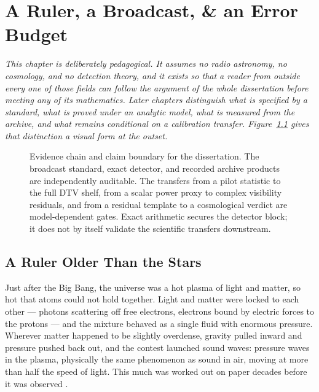 
\chapter{A Ruler, a Broadcast, \& an Error Budget}
\label{sec:intro}

\noindent\emph{This chapter is deliberately pedagogical. It assumes no radio astronomy, no cosmology, and no detection theory, and it exists so that a reader from outside every one of those fields can follow the argument of the whole dissertation before meeting any of its mathematics. Later chapters distinguish what is specified by a standard, what is proved under an analytic model, what is measured from the archive, and what remains conditional on a calibration transfer. Figure~\ref{fig:intro:claimchain} gives that distinction a visual form at the outset.}

\begin{figure}[t]
\centering
\resizebox{\linewidth}{!}{}
\caption[Evidence chain and claim boundary]{Evidence chain and claim boundary for the dissertation. The broadcast standard, exact detector, and recorded archive products are independently auditable. The transfers from a pilot statistic to the full DTV shelf, from a scalar power proxy to complex visibility residuals, and from a residual template to a cosmological verdict are model-dependent gates. Exact arithmetic secures the detector block; it does not by itself validate the scientific transfers downstream.}
\label{fig:intro:claimchain}
\end{figure}

\section{A Ruler Older Than the Stars}
\label{sec:intro:ruler}

Just after the Big Bang, the universe was a hot plasma of light and matter, so hot that atoms could not hold together. Light and matter were locked to each other --- photons scattering off free electrons, electrons bound by electric forces to the protons --- and the mixture behaved as a single fluid with enormous pressure. Wherever matter happened to be slightly overdense, gravity pulled inward and pressure pushed back out, and the contest launched sound waves: pressure waves in the plasma, physically the same phenomenon as sound in air, moving at more than half the speed of light. This much was worked out on paper decades before it was observed \cite{peebles1970,sunyaev1970}.


